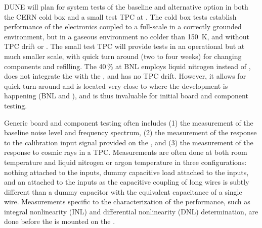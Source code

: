 DUNE will plan for system tests of the baseline and alternative option in both the CERN cold box and a small test TPC at \fnal.  The cold box tests establish performance of the electronics coupled to a full-scale  in a correctly grounded environment, but in a gaseous environment no colder than \SI{150}{K}, and without TPC drift or .  The small test TPC will provide tests in an operational \lartpc but at much smaller scale, with quick turn around (two to four weeks) for changing components and refilling.  The \num{40}\,\%  at BNL employs liquid nitrogen instead of \lar, does not integrate the  with the , and has no TPC drift.  However, it allows for quick turn-around and is located very close to where the development is happening (BNL and \fnal), and is thus invaluable for initial board and component testing.

Generic board and component testing often includes (1) the measurement of the baseline noise level and frequency spectrum, (2) the measurement of the response to the calibration input signal provided on the , and (3) the measurement of the response to cosmic rays in a TPC.  Measurements are often done at both room temperature and liquid nitrogen or argon temperature in three configurations: nothing attached to the inputs, dummy capacitive load attached to the inputs, and an  attached to the inputs as the capacitive coupling of long wires is subtly different than a dummy capacitor with the equivalent capacitance of a single wire.  Measurements specific to the characterization of the  performance, such as integral nonlinearity (INL) and differential nonlinearity (DNL) determination, are done before the  is mounted on the .
